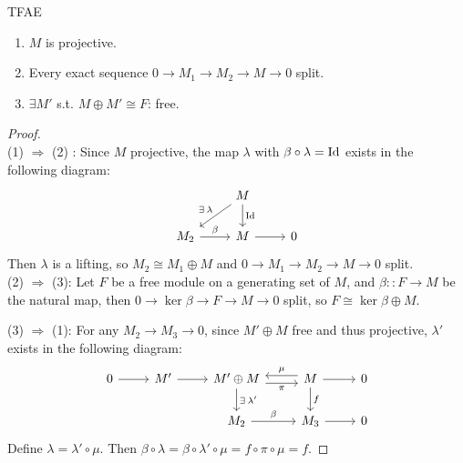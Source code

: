 \begin{prop} \label{prop:tfae-of-projective-module}
  TFAE
  \begin{enumerate}
    \item $M$ is projective.
    \item Every exact sequence $0 \to M_1 \to M_2 \to M \to 0$ split.
    \item $\exists M'$ s.t. $M \oplus M' \cong F$: free.
  \end{enumerate}
  \begin{proof} $ $\\
    (1) $\Rightarrow$ (2) : Since $M$ projective, the map $\lambda$ with
    $\beta \circ \lambda = {\rm Id}$ exists in the following diagram:\\
    \[
      \begin{tikzcd}
                            & M \ar[d, "\Id"] \ar[dl,"\exists \lambda"swap] \\
        M_2 \ar[r, "\beta"] & M \ar[r]        & 0
      \end{tikzcd}
    \]
    Then $\lambda$ is a lifting, so $M_2 \cong M_1 \oplus M$ and $0 \to M_1 \to M_2 \to M \to 0$ split. \\

    (2) $\Rightarrow$ (3): Let $F$ be a free module on a generating set of $M$,
    and $\beta :: F \to M$ be the natural map,
    then $0 \to \ker \beta \to F \to M \to 0$ split,
    so $F \cong \ker \beta \oplus M$.

    (3) $\Rightarrow$ (1):
    For any $M_2 \to M_3 \to 0$, since $M' \oplus M$ free and thus projective,
    $\lambda'$ exists in the following diagram:
    \[
      \begin{tikzcd}
        0 \ar[r] & M' \ar[r] & M' \oplus M \ar[r, "\pi" swap, 
        yshift=-0.7ex] \ar[d, "\exists \lambda'"]
        & M \ar[r] \ar[d, "f"] \ar[l, "\mu" swap, yshift=0.7ex] & 0 \\
         & & M_2 \ar[r, "\beta"] & M_3 \ar[r] & 0
      \end{tikzcd}
    \]
    Define $\lambda = \lambda' \circ \mu$. Then $\beta \circ \lambda= 
    \beta \circ \lambda' \circ \mu = f \circ \pi \circ \mu = f$.
  \end{proof}
\end{prop}

